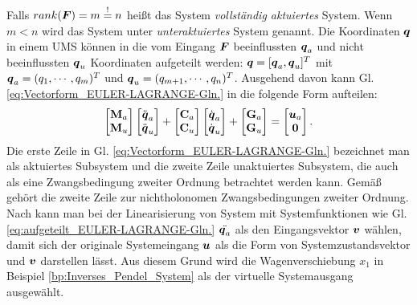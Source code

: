 Falls $rank(\boldsymbol F) = m \stackrel{!}{=} n$ heißt das System \emph{vollständig aktuiertes} System. Wenn $m < n$ wird das System unter \emph{unteraktuiertes} System genannt. Die Koordinaten $\boldsymbol q$ in einem UMS können in die vom Eingang $\boldsymbol F$ beeinflussten $\boldsymbol q_{a}$ und nicht beeinflussten $\boldsymbol q_{u}$ Koordinaten aufgeteilt werden: $\boldsymbol q =  [\boldsymbol q_{a},\boldsymbol q_{u}]^T$ mit $\boldsymbol q_{a}=(q_{1},\cdots,q_{m})^{T}$ und $\boldsymbol q_{u} = (q_{m+1},\cdots,q_{n})^{T}$. Ausgehend davon kann Gl. \eqref{eq:Vectorform_EULER-LAGRANGE-Gln.} in die folgende Form aufteilen:
\begin{eqnarray}
\begin{bmatrix}
\mathbf{M}_{a}\\ \mathbf{M}_{u}
\end{bmatrix}\begin{bmatrix}
\ddot{\boldsymbol q}_{a}\\\ddot{\boldsymbol q}_{u} 
\end{bmatrix} + \begin{bmatrix}
\mathbf{C}_{a}\\\mathbf{C}_{u} 
\end{bmatrix}\begin{bmatrix}
\dot{\boldsymbol q}_{a}\\\dot{\boldsymbol q}_{u}
\end{bmatrix} + \begin{bmatrix}
\mathbf{G}_{a}\\\mathbf{G}_{u}
\end{bmatrix} = \begin{bmatrix}
\boldsymbol u_{a}\\ \boldsymbol 0 
\end{bmatrix}.\label{eq:aufgeteilt_EULER-LAGRANGE-Gln.}
\end{eqnarray}
Die erste Zeile in Gl. \eqref{eq:Vectorform_EULER-LAGRANGE-Gln.} bezeichnet man als aktuiertes Subsystem und die zweite Zeile unaktuiertes Subsystem, die auch als eine Zwangsbedingung zweiter Ordnung betrachtet werden kann. Gemäß \cite{oriolo1991control} gehört die zweite Zeile zur nichtholonomen Zwangsbedingungen zweiter Ordnung. Nach \cite{spong1995swing} kann man bei der Linearisierung von System mit Systemfunktionen wie Gl. \eqref{eq:aufgeteilt_EULER-LAGRANGE-Gln.} $\ddot{\boldsymbol q_{a}}$ als den Eingangsvektor $\boldsymbol v$ wählen, damit sich der originale Systemeingang $\boldsymbol u$ als die Form von Systemzustandsvektor und $\boldsymbol v$ darstellen lässt. Aus diesem Grund wird die Wagenverschiebung $x_{1}$ in Beispiel \ref{bp:Inverses_Pendel_System} als der virtuelle Systemausgang ausgewählt.

